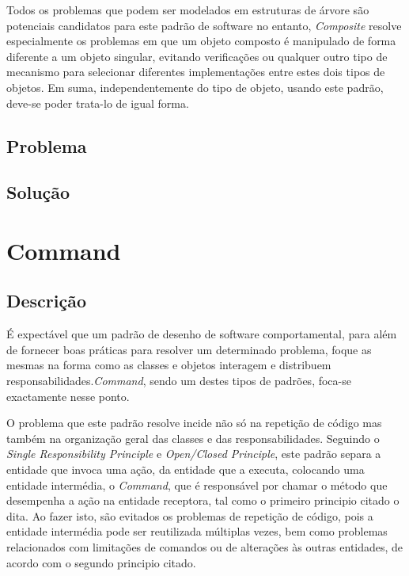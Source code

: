 \documentclass[10pt,portuguese]{article}
\begin{document}
\par Todos os problemas que podem ser modelados em estruturas de árvore são potenciais candidatos para este padrão de software no entanto, \textit{Composite} resolve especialmente os problemas em que um objeto composto é manipulado de forma diferente a um objeto singular, evitando verificações ou qualquer outro tipo de mecanismo para selecionar diferentes implementações entre estes dois tipos de objetos. Em suma, independentemente do tipo de objeto, usando este padrão, deve-se poder trata-lo de igual forma.



\par 

\par 
\subsection{Problema}
\subsection{Solução}

\clearpage

\section{Command}
\subsection{Descrição}

\par É expectável que um padrão de desenho de software comportamental, para além de fornecer boas práticas para resolver um determinado problema, foque as mesmas na forma como as classes e objetos interagem e distribuem responsabilidades.\textit{Command}, sendo um destes tipos de padrões, foca-se exactamente nesse ponto.

\par O problema que este padrão resolve incide não só na repetição de código mas também na organização geral das classes e das responsabilidades. Seguindo o \textit{Single Responsibility Principle} e \textit{Open/Closed Principle}, este padrão separa a entidade que invoca uma ação, da entidade que a executa, colocando uma entidade intermédia, o \textit{Command}, que é responsável por chamar o método que desempenha a ação na entidade receptora, tal como o primeiro principio citado o dita.
Ao fazer isto, são evitados os problemas de repetição de código, pois a entidade intermédia pode ser reutilizada múltiplas vezes, bem como problemas relacionados com limitações de comandos ou de alterações às outras entidades, de acordo com o segundo principio citado.
\end{document}
